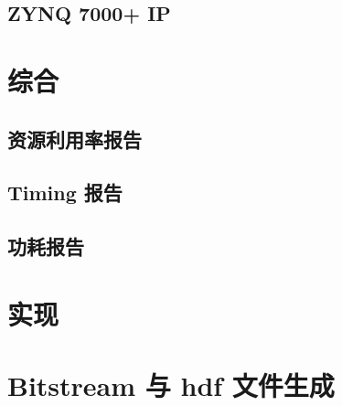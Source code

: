 \subsection{ZYNQ 7000+ IP}

\section{综合}

\subsection{资源利用率报告}

\subsection{Timing 报告}

\subsection{功耗报告}

\section{实现}

\section{Bitstream 与 hdf 文件生成}










